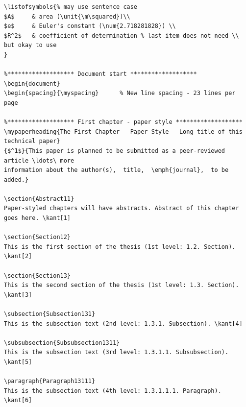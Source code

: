 \documentclass[letterpaper]{refart}
\begin{document}
{\begin{verbatim}
\listofsymbols{% may use sentence case
$A$     & area (\unit{\m\squared})\\
$e$     & Euler's constant (\num{2.718281828}) \\
$R^2$   & coefficient of determination % last item does not need \\  but okay to use
}

%******************* Document start *******************
\begin{document}
\begin{spacing}{\myspacing}      % New line spacing - 23 lines per page

%******************* First chapter - paper style *******************
\mypaperheading{The First Chapter - Paper Style - Long title of this technical paper}
{$^1$}{This paper is planned to be submitted as a peer-reviewed article \ldots\ more 
information about the author(s),  title,  \emph{journal},  to be added.}

\section{Abstract11}
Paper-styled chapters will have abstracts. Abstract of this chapter goes here. \kant[1]

\section{Section12}
This is the first section of the thesis (1st level: 1.2. Section). \kant[2]

\section{Section13}
This is the second section of the thesis (1st level: 1.3. Section). \kant[3]

\subsection{Subsection131}
This is the subsection text (2nd level: 1.3.1. Subsection). \kant[4]

\subsubsection{Subsubsection1311}
This is the subsection text (3rd level: 1.3.1.1. Subsubsection). \kant[5]

\paragraph{Paragraph13111}
This is the subsection text (4th level: 1.3.1.1.1. Paragraph). \kant[6]


\end{verbatim}}
\end{document}
